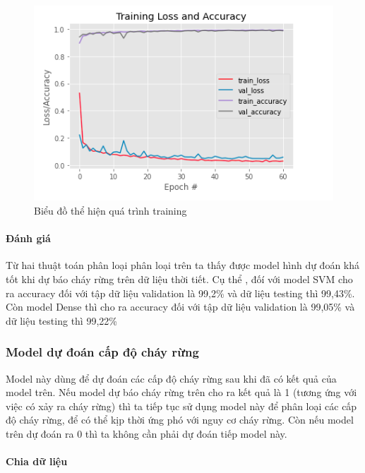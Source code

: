 \documentclass{article}
\begin{document}
\begin{figure}[H]
	\centering
	\includegraphics[width=6in]{images/loss_acc_model1_0.png}
	\caption{Biểu đồ thể hiện quá trình training}
\end{figure}

\paragraph{Đánh giá}

Từ hai thuật toán phân loại phân loại trên ta thấy được model hình dự đoán khá tốt khi dự báo cháy rừng trên dữ liệu thời tiết. Cụ thể , đốí với model SVM cho ra accuracy đối với tập dữ liệu validation là 99,2\% và dữ liệu testing thì 99,43\%. Còn model Dense thì cho ra accuracy đối với tập dữ liệu validation là 99,05\% và dữ liệu testing thì 99,22\%



\subsubsection{Model dự đoán cấp độ cháy rừng}

Model này dùng để dự đoán các cấp độ cháy rừng sau khi đã có kết quả của model trên. Nếu model dự báo cháy rừng trên cho ra kết quả là 1 (tương ứng với việc có xảy ra cháy rừng) thì ta tiếp tục sử dụng model này để  phân loại các cấp độ cháy rừng, để có thể kịp thời ứng phó với nguy cơ cháy rừng. Còn nếu model trên dự đoán ra 0 thì ta không cần phải dự đoán tiếp model này.

\paragraph{Chia dữ liệu}
\end{document}
